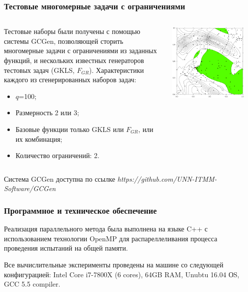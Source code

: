 \documentclass[aspectratio=1610]{beamer}
\begin{document}
\begin{frame}
  \frametitle{Тестовые многомерные задачи с ограничениями}
  \begin{columns}
    \begin{column}{0.5\textwidth}
      Тестовые наборы были получены с помощью системы GCGen, позволяющей
      сторить многомерные задачи с ограничениями из заданных функций, и нескольких
      известных генераторов тестовых задач (GKLS, \(F_{GR}\)).
      Характеристики каждого из сгенерированных наборов задач:
      \begin{itemize}
        \item \(q\)=100;
        \item Размерность 2 или 3;
        \item Базовые функции только GKLS или \(F_{GR}\), или их комбинация;
        \item Количество ограничений: 2.
      \end{itemize}
    \end{column}
    \begin{column}{0.5\textwidth}
      \centerline{\includegraphics[width=0.9\textwidth]{4.png}}
    \end{column}
  \end{columns}
  \footnotesize{Система GCGen доступна по ссылке \textit{https://github.com/UNN-ITMM-Software/GCGen}}
\end{frame}

\begin{frame}
  \frametitle{Программное и техническое обеспечение}
  \begin{center}
    Реализация параллельного метода была выполнена на языке C++ с использованием технологии OpenMP
    для распареллеливания процесса проведения испытаний на общей памяти.

    Все вычислительные
    эксперименты проведены на машине со следующей конфигурацией: Intel Core i7-7800X (6 cores), 64GB RAM, Unubtu 16.04 ОS, GCC 5.5 compiler.
  \end{center}
\end{frame}
\end{document}

